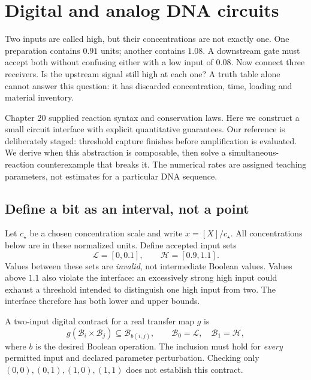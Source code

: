 \chapter{Digital and analog DNA circuits}

Two inputs are called high, but their concentrations are not exactly one.
One preparation contains $0.91$ units; another contains $1.08$. A downstream
gate must accept both without confusing either with a low input of $0.08$.
Now connect three receivers. Is the upstream signal still high at each one?
A truth table alone cannot answer this question: it has discarded concentration,
time, loading and material inventory.

Chapter 20 supplied reaction syntax and conservation laws. Here we construct a
small circuit interface with explicit quantitative guarantees. Our reference
is deliberately staged: threshold capture finishes before amplification is
evaluated. We derive when this abstraction is composable, then solve a
simultaneous-reaction counterexample that breaks it. The numerical rates are
assigned teaching parameters, not estimates for a particular DNA sequence.

\section{Define a bit as an interval, not a point}

Let $c_\star$ be a chosen concentration scale and write $x=[X]/c_\star$.
All concentrations below are in these normalized units. Define accepted input
sets
\begin{equation}
 \mathcal L=[0,0.1],\qquad \mathcal H=[0.9,1.1].
 \label{eq:bands}
\end{equation}
Values between these sets are \emph{invalid}, not intermediate Boolean values.
Values above $1.1$ also violate the interface: an excessively strong high input
could exhaust a threshold intended to distinguish one high input from two.
The interface therefore has both lower and upper bounds.

A two-input digital contract for a real transfer map $g$ is
\begin{equation}
 g(\mathcal B_i\times\mathcal B_j)\subseteq
 \mathcal B_{b(i,j)},\qquad
 \mathcal B_0=\mathcal L,\quad \mathcal B_1=\mathcal H ,
\end{equation}
where $b$ is the desired Boolean operation. The inclusion must hold for
\emph{every} permitted input and declared parameter perturbation. Checking only
$(0,0),(0,1),(1,0),(1,1)$ does not establish this contract.

